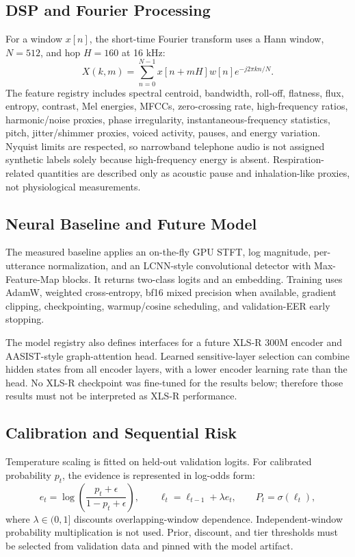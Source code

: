 \documentclass[journal]{IEEEtran}
\begin{document}
\subsection{DSP and Fourier Processing}
For a window $x[n]$, the short-time Fourier transform uses a Hann window, $N=512$, and hop $H=160$ at 16 kHz:
\begin{equation}
X(k,m)=\sum_{n=0}^{N-1}x[n+mH]w[n]e^{-j2\pi kn/N}.
\end{equation}
The feature registry includes spectral centroid, bandwidth, roll-off, flatness, flux, entropy, contrast, Mel energies, MFCCs, zero-crossing rate, high-frequency ratios, harmonic/noise proxies, phase irregularity, instantaneous-frequency statistics, pitch, jitter/shimmer proxies, voiced activity, pauses, and energy variation. Nyquist limits are respected, so narrowband telephone audio is not assigned synthetic labels solely because high-frequency energy is absent. Respiration-related quantities are described only as acoustic pause and inhalation-like proxies, not physiological measurements.

\subsection{Neural Baseline and Future Model}
The measured baseline applies an on-the-fly GPU STFT, log magnitude, per-utterance normalization, and an LCNN-style convolutional detector with Max-Feature-Map blocks. It returns two-class logits and an embedding. Training uses AdamW, weighted cross-entropy, bf16 mixed precision when available, gradient clipping, checkpointing, warmup/cosine scheduling, and validation-EER early stopping.

The model registry also defines interfaces for a future XLS-R 300M encoder and AASIST-style graph-attention head. Learned sensitive-layer selection can combine hidden states from all encoder layers, with a lower encoder learning rate than the head. No XLS-R checkpoint was fine-tuned for the results below; therefore those results must not be interpreted as XLS-R performance.

\subsection{Calibration and Sequential Risk}
Temperature scaling is fitted on held-out validation logits. For calibrated probability $p_t$, the evidence is represented in log-odds form:
\begin{equation}
e_t=\log\left(\frac{p_t+\epsilon}{1-p_t+\epsilon}\right),\qquad
\ell_t=\ell_{t-1}+\lambda e_t,\qquad P_t=\sigma(\ell_t),
\end{equation}
where $\lambda\in(0,1]$ discounts overlapping-window dependence. Independent-window probability multiplication is not used. Prior, discount, and tier thresholds must be selected from validation data and pinned with the model artifact.
\end{document}
